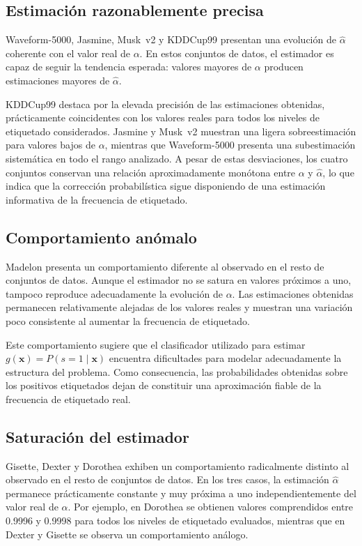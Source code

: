 \subsection{Estimación razonablemente precisa}
\label{subsec:alpha_correcto}

Waveform-5000, Jasmine, Musk~v2 y KDDCup99 presentan una evolución de $\hat{\alpha}$ coherente con el valor real de $\alpha$. En estos conjuntos de datos, el estimador es capaz de seguir la tendencia esperada: valores mayores de $\alpha$ producen estimaciones mayores de $\hat{\alpha}$.

KDDCup99 destaca por la elevada precisión de las estimaciones obtenidas, prácticamente coincidentes con los valores reales para todos los niveles de etiquetado considerados. Jasmine y Musk~v2 muestran una ligera sobreestimación para valores bajos de $\alpha$, mientras que Waveform-5000 presenta una subestimación sistemática en todo el rango analizado. A pesar de estas desviaciones, los cuatro conjuntos conservan una relación aproximadamente monótona entre $\alpha$ y $\hat{\alpha}$, lo que indica que la corrección probabilística sigue disponiendo de una estimación informativa de la frecuencia de etiquetado.

\subsection{Comportamiento anómalo}
\label{subsec:alpha_madelon}

Madelon presenta un comportamiento diferente al observado en el resto de conjuntos de datos. Aunque el estimador no se satura en valores próximos a uno, tampoco reproduce adecuadamente la evolución de $\alpha$. Las estimaciones obtenidas permanecen relativamente alejadas de los valores reales y muestran una variación poco consistente al aumentar la frecuencia de etiquetado.

Este comportamiento sugiere que el clasificador utilizado para estimar $g(\mathbf{x})=P(s=1\mid \mathbf{x})$ encuentra dificultades para modelar adecuadamente la estructura del problema. Como consecuencia, las probabilidades obtenidas sobre los positivos etiquetados dejan de constituir una aproximación fiable de la frecuencia de etiquetado real.

\subsection{Saturación del estimador}
\label{subsec:saturacion}

Gisette, Dexter y Dorothea exhiben un comportamiento radicalmente distinto al observado en el resto de conjuntos de datos. En los tres casos, la estimación $\hat{\alpha}$ permanece prácticamente constante y muy próxima a uno independientemente del valor real de $\alpha$. Por ejemplo, en Dorothea se obtienen valores comprendidos entre 0.9996 y 0.9998 para todos los niveles de etiquetado evaluados, mientras que en Dexter y Gisette se observa un comportamiento análogo.

